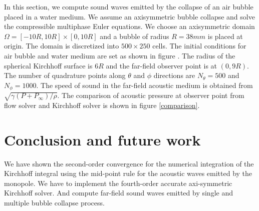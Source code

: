 \documentclass[12pt]{article}
\begin{document}
In this section, we compute sound waves emitted by the collapse of an air bubble placed in a water medium. We assume an axisymmetric bubble collapse and solve the compressible multiphase Euler equations.
We choose an axisymmetric domain $\Omega = [-10R,10R]\times[0,10R]$ and a bubble of radius $R = 38 mm$ is placed at origin. The domain is discretized into $500\times 250$ cells. The initial conditions for air bubble and water medium are set as shown in figure . The radius of the spherical Kirchhoff surface is $6R$ and the far-field observer point is at $(0, 9R)$. The number of quadrature points along $\theta$ and $\phi$ directions are $N_{\theta} = 500$ and $N_{\phi} = 1000$. The speed of sound in the far-field acoustic medium is obtained from $\sqrt{\gamma(P + P_{\infty})/\rho}$. The comparison of acoustic pressure at observer point from flow solver and Kirchhoff solver is shown in figure \ref{comparison}.


\section{Conclusion and future work}
We have shown the second-order convergence for the numerical integration of the Kirchhoff integral using the mid-point rule for the acoustic waves emitted by the monopole. We have to implement the fourth-order accurate axi-symmetric Kirchhoff solver. And compute far-field sound waves emitted by single and multiple bubble collapse process.

\printbibliography
\end{document}
